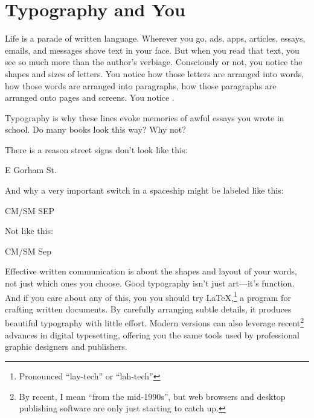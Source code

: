 \chapter{Typography and You}
\label{typography}

Life is a parade of written language.
Wherever you go,
ads, apps, articles, essays, emails, and messages
shove text in your face.
But when you read that text, you see so much more than the author's
verbiage.
Consciously or not, you notice the shapes and sizes of letters.
You notice how those letters are arranged into words,
how those words are arranged into paragraphs,
how those paragraphs are arranged onto pages and screens.
You notice .
\begin{leftfigure}
\fontsize{12bp}{24bp}\selectfont\raggedright
Typography is why these lines evoke memories of awful essays
you wrote in school.
Do many books look this way? Why not?
\end{leftfigure}
\medskip
\noindent There is a reason street signs don't look like this:
\begin{leftfigure}
\Large E Gorham St.
\end{leftfigure}
And why a very important switch in a spaceship might be labeled like this:
\begin{leftfigure}
CM/SM SEP
\end{leftfigure}
Not like this:
\begin{leftfigure}
\Large CM/SM Sep
\end{leftfigure}

Effective written communication is about the shapes and layout of your words,
not just which ones you choose.
Good typography isn't just art---it's function.
And if you care about any of this,
you you should try \LaTeX,\punckern\footnote{Pronounced ``lay-tech''
or ``lah-tech''}
a program for crafting written documents.
By carefully arranging subtle details,
it produces beautiful typography with little effort.
Modern versions can also leverage recent\footnote{By recent,
I mean ``from the mid-1990s''\quotekern, but web browsers and desktop publishing
software are only just starting to catch up.} advances in digital typesetting,
offering you the same tools used by professional graphic designers and
publishers.

